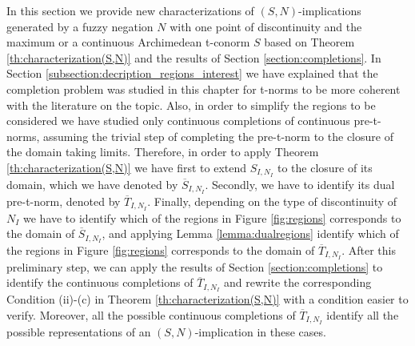 In this section we provide new characterizations of $(S,N)$-implications generated by a fuzzy negation $N$ with one point of discontinuity and the maximum or a continuous Archimedean t-conorm $S$ based on Theorem \ref{th:characterization(S,N)} and the results of Section \ref{section:completions}. In Section \ref{subsection:decription_regions_interest} we have explained that the completion problem was studied in this chapter for t-norms to be more coherent with the literature on the topic. Also, in order to simplify the regions to be considered we have studied only continuous completions of continuous pre-t-norms, assuming the trivial step of completing the pre-t-norm to the closure of the domain taking limits. Therefore, in order to  apply Theorem \ref{th:characterization(S,N)} we have first to extend $S_{I,N_I}$ to the closure of its domain, which we have denoted by $\overline{S}_{I,N_I}$. Secondly, we have to identify its dual pre-t-norm, denoted by $\overline{T}_{I,N_I}$. Finally, depending on the type of discontinuity of $N_I$ we have to identify which of the regions in Figure \ref{fig:regions} corresponds to the domain of $\overline{S}_{I,N_I}$, and applying Lemma \ref{lemma:dualregions} identify which of the regions in Figure \ref{fig:regions} corresponds to the domain of $\overline{T}_{I,N_I}$. After this preliminary step, we can apply the results of Section \ref{section:completions} to identify the continuous completions of $\overline{T}_{I,N_I}$ and rewrite the corresponding Condition (ii)-(c) in Theorem \ref{th:characterization(S,N)} with a condition easier to verify. Moreover, all the possible continuous completions of $\overline{T}_{I,N_I}$ identify all the possible representations of an $(S,N)$-implication in these cases.

